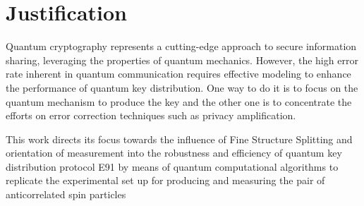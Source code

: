\section{Justification}

Quantum cryptography represents a cutting-edge approach to secure information sharing, leveraging the properties of quantum mechanics. However, the high error rate inherent in quantum communication requires effective modeling to enhance the performance of quantum key distribution.
One way to do it is to focus on the quantum mechanism to produce the key and the other one is to concentrate the efforts on error correction techniques such as privacy amplification\cite{nielsen2010quantum}.


This work directs its focus towards the influence of Fine Structure Splitting and orientation of measurement into the robustness and efficiency of quantum key distribution protocol E91 by means of quantum computational algorithms to replicate the experimental set up for producing and measuring the pair of anticorrelated spin particles